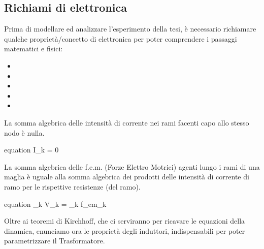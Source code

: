\subsection{Richiami di elettronica}
Prima di modellare ed analizzare l'esperimento della tesi, è necessario richiamare qualche proprietà/concetto di elettronica per poter comprendere i passaggi matematici e fisici:
\vspace{-5mm}
\begin{itemize}[itemsep=-4mm]
	\item {}
	\item {}
	\item {}
	\item {}
	\item {}
\end{itemize}


\begin{teorema}
	La somma algebrica delle intensità di corrente nei rami facenti capo allo stesso nodo è nulla.
	\begin{empheq}[box=\mathStep]{equation} \label{eq:KirchhoffNodi}
		\sum I_k = 0
	\end{empheq}
\end{teorema}

\begin{teorema}
	La somma algebrica delle f.e.m. (Forze Elettro Motrici) agenti lungo i rami di una maglia è uguale alla somma algebrica dei prodotti delle intensità di corrente di ramo per le rispettive resistenze (del ramo).
	\begin{empheq}[box=\mathStep]{equation} \label{eq:KirchhoffMaglie}
		\sum_{\forall k} V_k = \sum_{\forall k} f_{em_k}
	\end{empheq}
\end{teorema}
\vspace{-3mm}
\noindent
Oltre ai teoremi di Kirchhoff, che ci serviranno per ricavare le equazioni della dinamica, enunciamo ora le proprietà degli induttori, indispensabili per poter parametrizzare il Trasformatore.

